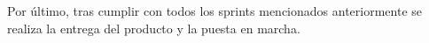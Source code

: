 Por último, tras cumplir con todos los sprints mencionados anteriormente se realiza la entrega del producto y la puesta en marcha.












